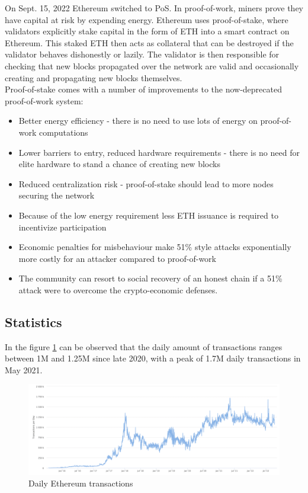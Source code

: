 \documentclass[MSE,Master,english]{twbook}%
\begin{document}
On Sept. 15, 2022 Ethereum switched to \ac{PoS}\cite{PoS}. In proof-of-work, miners prove they have capital at risk by expending energy. Ethereum uses proof-of-stake, where validators explicitly stake capital in the form of ETH into a smart contract on Ethereum. This staked ETH then acts as collateral that can be destroyed if the validator behaves dishonestly or lazily. The validator is then responsible for checking that new blocks propagated over the network are valid and occasionally creating and propagating new blocks themselves. \\

Proof-of-stake comes with a number of improvements to the now-deprecated proof-of-work system:

\begin{itemize}
  \item Better energy efficiency - there is no need to use lots of energy on proof-of-work computations
  \item Lower barriers to entry, reduced hardware requirements - there is no need for elite hardware to stand a chance of creating new blocks
  \item Reduced centralization risk - proof-of-stake should lead to more nodes securing the network
  \item Because of the low energy requirement less ETH issuance is required to incentivize participation
  \item Economic penalties for misbehaviour make 51\% style attacks exponentially more costly for an attacker compared to proof-of-work
  \item The community can resort to social recovery of an honest chain if a 51\% attack were to overcome the crypto-economic defenses.
\end{itemize}

\subsection{Statistics}

In the figure \ref{fig:dailyTxs} can be observed that the daily amount of transactions ranges between 1M and 1.25M since late 2020, with a peak of 1.7M daily transactions in May 2021.
\begin{figure}[H]
  \centering
  \includegraphics[width=\textwidth]{daily_txs.png}
  \caption{Daily Ethereum transactions \cite{etherscan}}
  \label{fig:dailyTxs}
\end{figure}
\end{document}
